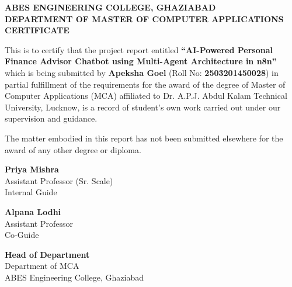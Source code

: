 \documentclass[12pt,a4paper]{report}
\begin{document}
\newpage
{}
\setcounter{page}{1}
\begin{center}
    \Large
    \textbf{ABES ENGINEERING COLLEGE, GHAZIABAD}\\
    \textbf{DEPARTMENT OF MASTER OF COMPUTER APPLICATIONS}\\
    \vspace{0.8cm}
    \Large
    \textbf{CERTIFICATE}\\
    \vspace{1.0cm}
\end{center}
\onehalfspacing
This is to certify that the project report entitled \textbf{``AI-Powered Personal Finance Advisor Chatbot using Multi-Agent Architecture in n8n''} which is being submitted by \textbf{Apeksha Goel} (Roll No: \textbf{2503201450028}) in partial fulfillment of the requirements for the award of the degree of Master of Computer Applications (MCA) affiliated to Dr. A.P.J. Abdul Kalam Technical University, Lucknow, is a record of student's own work carried out under our supervision and guidance. 

The matter embodied in this report has not been submitted elsewhere for the award of any other degree or diploma.
\vspace{1.8cm}

\noindent
\begin{minipage}[t]{0.45\textwidth}
    \centering
    \textbf{Priya Mishra}\\
    Assistant Professor (Sr. Scale)\\
    Internal Guide
\end{minipage}
\hfill
\begin{minipage}[t]{0.45\textwidth}
    \centering
    \textbf{Alpana Lodhi}\\
    Assistant Professor\\
    Co-Guide
\end{minipage}

\vspace{1.8cm}
\noindent
\begin{minipage}[t]{1.0\textwidth}
    \centering
    \textbf{Head of Department}\\
    Department of MCA\\
    ABES Engineering College, Ghaziabad
\end{minipage}

\newpage
\end{document}
